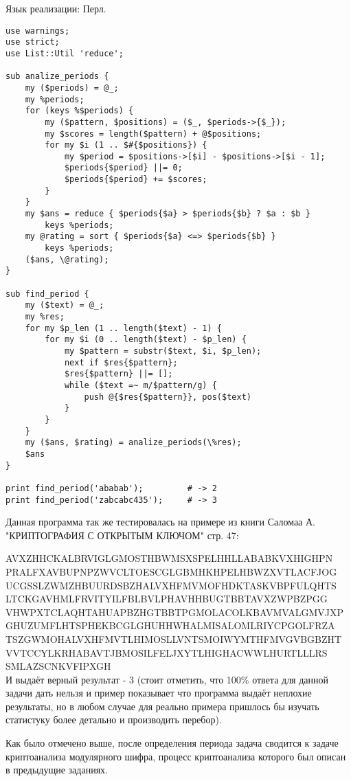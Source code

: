 \documentclass[10pt,a4paper]{article}
\begin{document}
Язык реализации: Перл.
\begin{lstlisting}
use warnings;
use strict;
use List::Util 'reduce';

sub analize_periods {
    my ($periods) = @_;
    my %periods;
    for (keys %$periods) {
        my ($pattern, $positions) = ($_, $periods->{$_});
        my $scores = length($pattern) + @$positions;
        for my $i (1 .. $#{$positions}) {
            my $period = $positions->[$i] - $positions->[$i - 1];
            $periods{$period} ||= 0;
            $periods{$period} += $scores;
        }
    }
    my $ans = reduce { $periods{$a} > $periods{$b} ? $a : $b }
        keys %periods;
    my @rating = sort { $periods{$a} <=> $periods{$b} }
        keys %periods;
    ($ans, \@rating);
}

sub find_period {
    my ($text) = @_;
    my %res;
    for my $p_len (1 .. length($text) - 1) {
        for my $i (0 .. length($text) - $p_len) {
            my $pattern = substr($text, $i, $p_len);
            next if $res{$pattern};
            $res{$pattern} ||= [];
            while ($text =~ m/$pattern/g) {
                push @{$res{$pattern}}, pos($text)
            }
        }
    }
    my ($ans, $rating) = analize_periods(\%res);
    $ans
}

print find_period('ababab');         # -> 2 
print find_period('zabcabc435');     # -> 3

\end{lstlisting}

Данная программа так же тестировалась на примере из книги Саломаа
А. "КРИПТОГРАФИЯ С ОТКРЫТЫМ КЛЮЧОМ" стр. 47:

AVXZHHCKALBRVIGLGMOSTHBWMSXSPELHHLLABABKVXHIGHPN \\
PRALFXAVBUPNPZWVCLTOESCGLGBMHKHPELHBWZXVTLACFJOG \\
UCGSSLZWMZHBUURDSBZHALVXHFMVMOFHDKTASKVBPFULQHTS \\
LTCKGAVHMLFRVITYILFBLBVLPHAVHHBUGTBBTAVXZWPBZPGG \\
VHWPXTCLAQHTAHUAPBZHGTBBTPGMOLACOLKBAVMVALGMVJXP \\
GHUZUMFLHTSPHEKBCGLGHUHHWHALMISALOMLRIYCPGOLFRZA \\
TSZGWMOHALVXHFMVTLHIMOSLLVNTSMOIWYMTHFMVGVBGBZHT \\
VVTCCYLKRHABAVTJBMOSILFELJXYTLHIGHACWWLHURTLLLRS \\
SMLAZSCNKVFIPXGH \\

И выдаёт верный результат - 3 (стоит отметить, что 100\% ответа для
данной задачи дать нельзя и пример показывает что программа выдаёт
неплохие результаты, но в любом случае для реально примера пришлось 
бы изучать статистуку более детально и производить перебор).

Как было отмечено выше, после определения периода задача сводится к
задаче криптоанализа модулярного шифра, процесс криптоанализа которого
был описан в предыдущие заданиях.
\end{document}
